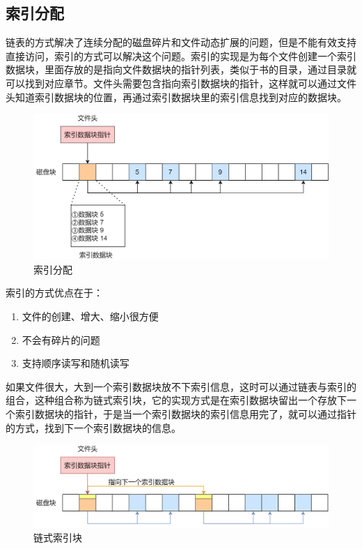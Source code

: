 \subsection{索引分配}

链表的方式解决了连续分配的磁盘碎片和文件动态扩展的问题，但是不能有效支持直接访问，索引的方式可以解决这个问题。索引的实现是为每个文件创建一个索引数据块，里面存放的是指向文件数据块的指针列表，类似于书的目录，通过目录就可以找到对应章节。文件头需要包含指向索引数据块的指针，这样就可以通过文件头知道索引数据块的位置，再通过索引数据块里的索引信息找到对应的数据块。

\begin{figure}[H]
    \centering
    \includegraphics[scale=0.35]{img/C5/5-4/5.png}
    \caption{索引分配}
\end{figure}

索引的方式优点在于：

\begin{enumerate}
    \item 文件的创建、增大、缩小很方便
    \item 不会有碎片的问题
    \item 支持顺序读写和随机读写
\end{enumerate}

如果文件很大，大到一个索引数据块放不下索引信息，这时可以通过链表与索引的组合，这种组合称为链式索引块，它的实现方式是在索引数据块留出一个存放下一个索引数据块的指针，于是当一个索引数据块的索引信息用完了，就可以通过指针的方式，找到下一个索引数据块的信息。

\begin{figure}[H]
    \centering
    \includegraphics[scale=0.4]{img/C5/5-4/6.png}
    \caption{链式索引块}
\end{figure}

